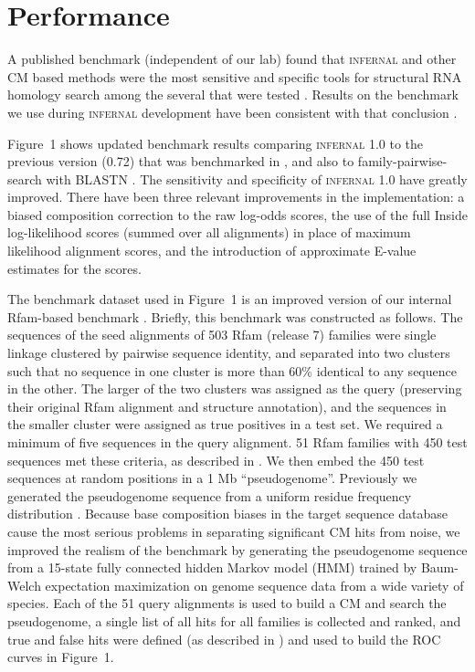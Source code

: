 \documentclass[11pt]{article}
\begin{document}
\section{Performance}

A published benchmark (independent of our lab) found that
\textsc{infernal} and other CM based methods were the most sensitive
and specific tools for structural RNA homology search among the
several that were tested \citep{Freyhult07}.  Results on the benchmark
we use during \textsc{infernal} development have been consistent with
that conclusion \citep{NawrockiEddy07}. 

Figure~1 shows updated benchmark results comparing \textsc{infernal}
1.0 to the previous version (0.72) that was benchmarked in
\citep{Freyhult07}, and also to family-pairwise-search with BLASTN
\citep{Altschul97,Grundy98b}.  The sensitivity and specificity of
\textsc{infernal} 1.0 have greatly improved. There have been three
relevant improvements in the implementation: a biased composition
correction to the raw log-odds scores, the use of the full Inside
log-likelihood scores (summed over all alignments) in place of maximum
likelihood alignment scores, and the introduction of approximate
E-value estimates for the scores.

The benchmark dataset used in Figure~1 is an improved version of our
internal Rfam-based benchmark \citep{NawrockiEddy07}. Briefly, this
benchmark was constructed as follows. The sequences of the seed
alignments of 503 Rfam (release 7) families were single linkage
clustered by pairwise sequence identity, and separated into two
clusters such that no sequence in one cluster is more than 60\%
identical to any sequence in the other. The larger of the two clusters
was assigned as the query (preserving their original Rfam alignment
and structure annotation), and the sequences in the smaller cluster
were assigned as true positives in a test set. We required a minimum
of five sequences in the query alignment. 51 Rfam families with 450
test sequences met these criteria, as described in
\citep{NawrockiEddy07}. We then embed the 450 test sequences at random
positions in a 1 Mb ``pseudogenome''. Previously we generated the
pseudogenome sequence from a uniform residue frequency distribution
\citep{NawrockiEddy07}. Because base composition biases in the target
sequence database cause the most serious problems in separating
significant CM hits from noise, we improved the realism of the
benchmark by generating the pseudogenome sequence from a 15-state
fully connected hidden Markov model (HMM) trained by Baum-Welch
expectation maximization \citep{Durbin98} on genome sequence data from
a wide variety of species. Each of the 51 query alignments is used to
build a CM and search the pseudogenome, a single list of all hits for
all families is collected and ranked, and true and false hits were
defined (as described in \citep{NawrockiEddy07}) and used to build the
ROC curves in Figure~1.
\end{document}
